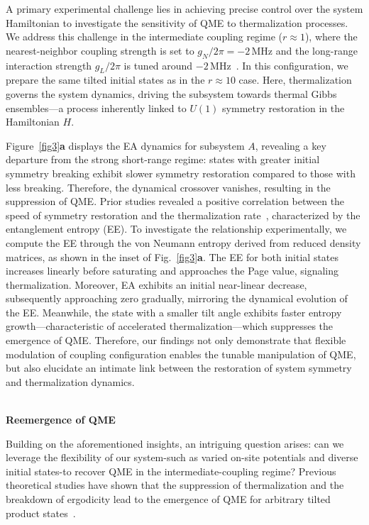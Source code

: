 \documentclass[reprint,superscriptaddress,preprintnumbers,longbibliography,
amsmath,amssymb,aps,floatfix,pra,twocolumn, tightenlines %
]{revtex4-2}
\begin{document}
    A primary experimental challenge lies in achieving precise control over the system Hamiltonian to investigate the sensitivity of QME to thermalization processes. We address this challenge in the intermediate coupling regime (\( r \approx 1 \)), where the nearest-neighbor coupling strength is set to \( g_N/2\pi = -2 \, \text{MHz} \) and the long-range interaction strength \( g_L/2\pi \) is tuned around \(-2 \, \text{MHz}\)~\cite{supp_cite}. In this configuration, we prepare the same tilted initial states as in the \(r\approx10\) case. Here, thermalization governs the system dynamics, driving the subsystem towards thermal Gibbs ensembles—a process inherently linked to $ U(1) $ symmetry restoration in the Hamiltonian $ H $.
    
    Figure~\ref{fig3}\textbf{a} displays the EA dynamics for subsystem \(A\), revealing a key departure from the strong short-range regime: states with greater initial symmetry breaking exhibit slower symmetry restoration compared to those with less breaking. Therefore, the dynamical crossover vanishes, resulting in the suppression of QME. Prior studies revealed a positive correlation between the speed of symmetry restoration and the thermalization rate~\cite{random_circuits_2024}, characterized by the entanglement entropy (EE). To investigate the relationship experimentally, we compute the EE through the von Neumann entropy derived from reduced density matrices, as shown in the inset of Fig.~\ref{fig3}\textbf{a}. 
    The EE for both initial states increases linearly before saturating and approaches the Page value, signaling thermalization. Moreover, EA exhibits an initial near-linear decrease, subsequently approaching zero gradually, mirroring the dynamical evolution of the EE. 
    Meanwhile, the state with a smaller tilt angle exhibits faster entropy growth---characteristic of accelerated thermalization---which suppresses the emergence of QME. Therefore, our findings not only demonstrate that flexible modulation of coupling configuration enables the tunable manipulation of QME, but also elucidate an intimate link between the restoration of system symmetry and thermalization dynamics.
    	
	~\\
	\textbf{\textbf{Reemergence of QME}}

    Building on the aforementioned insights, an intriguing question arises: can we leverage the flexibility of our system-such as varied on-site potentials and diverse initial states-to recover QME in the intermediate-coupling regime? Previous theoretical studies have shown that the suppression of thermalization and the breakdown of ergodicity lead to the emergence of QME for arbitrary tilted product states~\cite{QME_MBL}. 
    
\end{document}
